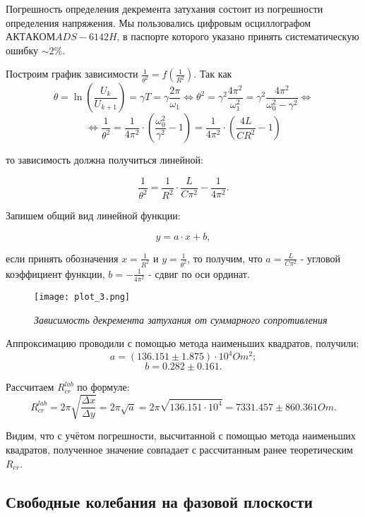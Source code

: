 \documentclass[a4paper,12pt]{article} %
\begin{document}
    Погрешность определения декремента затухания состоит из погрешности определения напряжения. Мы пользовались цифровым осциллографом $АКТАКОМ ADS-6142H$, в паспорте которого указано принять систематическую ошибку $\sim 2 \%$.

    Построим график зависимости $\frac{1}{\theta^2} = f(\frac{1}{R^2})$. Так как
	\[\theta = \ln\left(\frac{U_k}{U_{k + 1}}\right) = \gamma T = \gamma \frac{2\pi}{\omega_1} \Longleftrightarrow \theta^2 = \gamma^2\frac{4\pi^2}{\omega_1^2} = \gamma^2 \frac{4\pi^2}{\omega_0^2 - \gamma^2} \Longleftrightarrow \]
	\[ \Longleftrightarrow \frac{1}{\theta^2} = \frac{1}{4\pi^2}\cdot\left(\frac{\omega_0^2}{\gamma^2} - 1\right) = \frac{1}{4\pi^2}\cdot\left(\frac{4L}{CR^2} - 1\right)\]
	
	то зависимость должна получиться линейной:
	
	\[\frac{1}{\theta^2} = \frac{1}{R^2}\cdot\frac{L}{C\pi^2} - \frac{1}{4\pi^2}.\]

     Запишем общий вид линейной функции:

        \[ y = a \cdot x + b, \]

    если принять обозначения $x = \frac{1}{R^2}$ и  $y = \frac{1}{\theta^2}$, то получим, что $a = \frac{L}{C\pi^2}$ - угловой коэффициент функции, $b = - \frac{1}{4\pi^2}$ - сдвиг по оси ординат.

    \begin{figure}[h]
    \begin{center}
		\texttt{[image: plot\_3.png]}
    \end{center}
	\caption{\textit{Зависимость декремента затухания от суммарного сопротивления}}
	\label{plot3}
    \end{figure}

    Аппроксимацию проводили с помощью метода наименьших квадратов, получили:
    \[ a = (136.151 \pm 1.875) \cdot 10^{4} Om^{2};\]
    \[ b = 0.282 \pm 0.161. \]

    Рассчитаем $R_{cr}^{lab}$ по формуле:
    \[ R_{cr}^{lab} = 2\pi\sqrt{\frac{\Delta x}{\Delta y}} = 2\pi\sqrt{a} = 2\pi\sqrt{136.151 \cdot 10^{4}} = 7331.457 \pm 860.361 Om.  \]

    Видим, что с учётом погрешности, высчитанной с помощью метода наименьших квадратов, полученное значение совпадает с рассчитанным ранее теоретическим $R_{cr}$.

\newpage

\subsection{Свободные колебания на фазовой плоскости}
\end{document}
